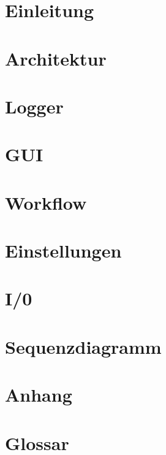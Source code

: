 

	\maketitle
	\setcounter{tocdepth}{1}
	\tableofcontents
	\chapter{Einleitung}
		
	\chapter{Architektur}
		
	\chapter{Logger}
		
	\chapter{GUI}
		
	\chapter{Workflow}
		
	\chapter{Einstellungen}
		
	\chapter{I/0}
		
	\chapter{Sequenzdiagramm}
		
	\chapter{Anhang}
		
	\chapter{Glossar}
		
